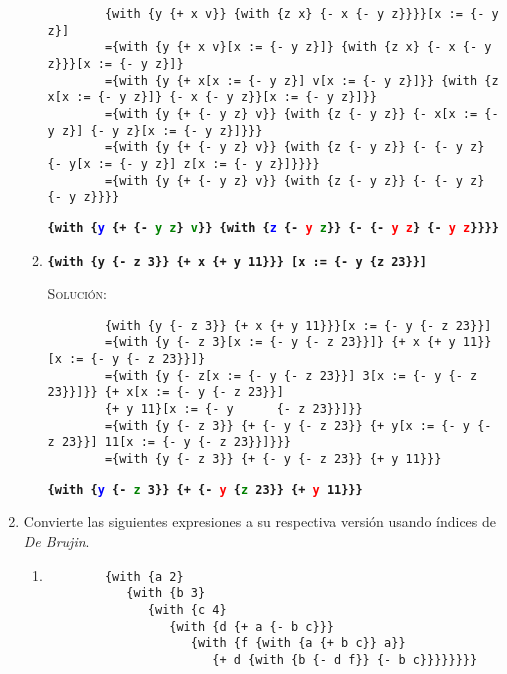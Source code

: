 \documentclass[letterpaper,11pt]{article}
\begin{document}
\begin{enumerate}
\begin{enumerate}
        \begin{verbatim}
        {with {y {+ x v}} {with {z x} {- x {- y z}}}}[x := {- y z}]
        ={with {y {+ x v}[x := {- y z}]} {with {z x} {- x {- y z}}}[x := {- y z}]}
        ={with {y {+ x[x := {- y z}] v[x := {- y z}]}} {with {z x[x := {- y z}]} {- x {- y z}}[x := {- y z}]}}
        ={with {y {+ {- y z} v}} {with {z {- y z}} {- x[x := {- y z}] {- y z}[x := {- y z}]}}}
        ={with {y {+ {- y z} v}} {with {z {- y z}} {- {- y z} {- y[x := {- y z}] z[x := {- y z}]}}}}
        ={with {y {+ {- y z} v}} {with {z {- y z}} {- {- y z} {- y z}}}}
        \end{verbatim}
        \texttt{\textbf{\{with \{\textcolor{blue}{y} \{+ \{- \textcolor{green}{y} \textcolor{green}{z}\} 					\textcolor{green}{v}\}\} \{with \{\textcolor{blue}{z} \{- \textcolor{red}{y} \textcolor{green}{z}\}\} 
        \{- \{- \textcolor{red}{y} \textcolor{red}{z}\} \{- \textcolor{red}{y} \textcolor{red}{z}\}\}\}\}}}
        
        
        \item \texttt{\textbf{\{with \{y \{- z 3\}\} \{+ x \{+ y 11\}\}\} 
        [x := \{- y \{z 23\}\}]}}

        \textsc{Solución:}
        
        \begin{verbatim}
        {with {y {- z 3}} {+ x {+ y 11}}}[x := {- y {- z 23}}]
        ={with {y {- z 3}[x := {- y {- z 23}}]} {+ x {+ y 11}}[x := {- y {- z 23}}]}
        ={with {y {- z[x := {- y {- z 23}}] 3[x := {- y {- z 23}}]}} {+ x[x := {- y {- z 23}}] 
        {+ y 11}[x := {- y 		{- z 23}}]}}
        ={with {y {- z 3}} {+ {- y {- z 23}} {+ y[x := {- y {- z 23}}] 11[x := {- y {- z 23}}]}}}
        ={with {y {- z 3}} {+ {- y {- z 23}} {+ y 11}}}
        \end{verbatim}
        \texttt{\textbf{\{with \{\textcolor{blue}{y} \{- \textcolor{green}{z} 3\}\} \{+ \{- \textcolor{red}{y} 
        \{\textcolor{green}{z} 23\}\} \{+ \textcolor{red}{y} 11\}\}\}}}
        
        
    \end{enumerate}

    \item Convierte las siguientes expresiones a su respectiva versión usando
    índices de \textit{De Brujin}.
    \begin{enumerate}
        \item 
        \begin{verbatim}
        {with {a 2} 
           {with {b 3} 
              {with {c 4} 
                 {with {d {+ a {- b c}}} 
                    {with {f {with {a {+ b c}} a}} 
                       {+ d {with {b {- d f}} {- b c}}}}}}}}
        \end{verbatim}


\end{enumerate}
\end{enumerate}
\end{document}
